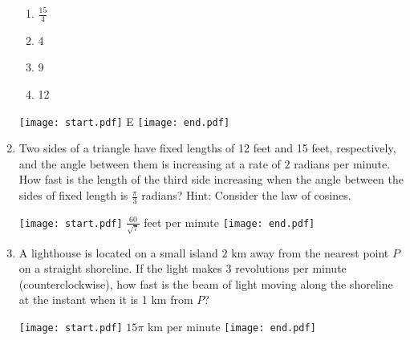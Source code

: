\documentclass[12pt]{article}
\begin{document}
\begin{enumerate}
\begin{enumerate}
\item $\frac{15}{4}$

\item 4

\item 9

\item 12

\end{enumerate}

\texttt{[image: start.pdf]}
{{E}}
\texttt{[image: end.pdf]}


\item Two sides of a triangle have fixed lengths of 12 feet and 15 feet, respectively, and the angle between them is increasing at a rate of $2$ radians per minute.  How fast is the length of the third side increasing when the angle between the sides of fixed length is $\frac{\pi}{3}$ radians?  Hint: Consider the law of cosines.

\texttt{[image: start.pdf]}
{{$\frac{60}{\sqrt{7}}$ feet per minute}}
\texttt{[image: end.pdf]}


\item A lighthouse is located on a small island $2$ km away from the nearest point $P$ on a straight shoreline.  If the light makes 3 revolutions per minute (counterclockwise), how fast is the beam of light moving along the shoreline at the instant when it is 1 km from $P$?

\texttt{[image: start.pdf]}
{{$15\pi$ km per minute}}
\texttt{[image: end.pdf]}


\end{enumerate}
\end{document}
